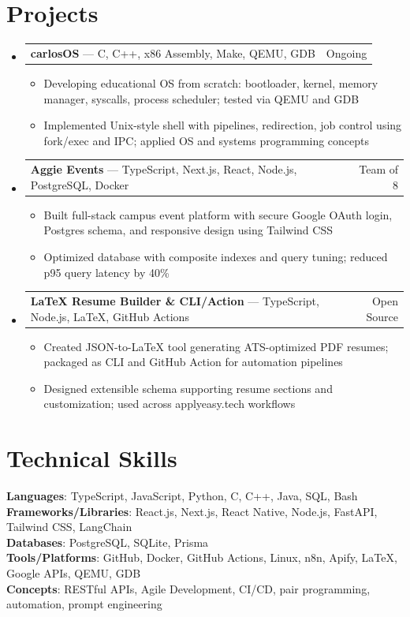 \documentclass[letterpaper,11pt]{article}
\makeatletter
\newcommand{\resumeItem}[1]{
  \item\small{{#1 \vspace{-2pt}}}
}
\newcommand{\resumeProjectHeading}[2]{
    \item
    \begin{tabular*}{0.97\textwidth}{l@{\extracolsep{\fill}}r}
      \small#1 & #2 \\
    \end{tabular*}\vspace{-7pt}
}
\newcommand{\resumeSubHeadingListStart}{\begin{itemize}[leftmargin=0.15in, label={}]}
\newcommand{\resumeSubHeadingListEnd}{\end{itemize}}
\newcommand{\resumeItemListStart}{\begin{itemize}}
\newcommand{\resumeItemListEnd}{\end{itemize}\vspace{-5pt}}
\makeatother
\begin{document}
\section{Projects}
\resumeSubHeadingListStart
  \resumeProjectHeading
    {\textbf{carlosOS} — C, C++, x86 Assembly, Make, QEMU, GDB}{Ongoing}
    \resumeItemListStart
      \resumeItem{Developing educational OS from scratch: bootloader, kernel, memory manager, syscalls, process scheduler; tested via QEMU and GDB}
      \resumeItem{Implemented Unix-style shell with pipelines, redirection, job control using fork/exec and IPC; applied OS and systems programming concepts}
    \resumeItemListEnd

  \resumeProjectHeading
    {\textbf{Aggie Events} — TypeScript, Next.js, React, Node.js, PostgreSQL, Docker}{Team of 8}
    \resumeItemListStart
      \resumeItem{Built full-stack campus event platform with secure Google OAuth login, Postgres schema, and responsive design using Tailwind CSS}
      \resumeItem{Optimized database with composite indexes and query tuning; reduced p95 query latency by 40\%}
    \resumeItemListEnd

  \resumeProjectHeading
    {\textbf{LaTeX Resume Builder \& CLI/Action} — TypeScript, Node.js, LaTeX, GitHub Actions}{Open Source}
    \resumeItemListStart
      \resumeItem{Created JSON-to-LaTeX tool generating ATS-optimized PDF resumes; packaged as CLI and GitHub Action for automation pipelines}
      \resumeItem{Designed extensible schema supporting resume sections and customization; used across applyeasy.tech workflows}
    \resumeItemListEnd
\resumeSubHeadingListEnd

\section{Technical Skills}
\begin{itemize}[leftmargin=0.15in, label={}]
  \small{\item{
    \textbf{Languages}{: TypeScript, JavaScript, Python, C, C++, Java, SQL, Bash} \\
    \textbf{Frameworks/Libraries}{: React.js, Next.js, React Native, Node.js, FastAPI, Tailwind CSS, LangChain} \\
    \textbf{Databases}{: PostgreSQL, SQLite, Prisma} \\
    \textbf{Tools/Platforms}{: GitHub, Docker, GitHub Actions, Linux, n8n, Apify, LaTeX, Google APIs, QEMU, GDB} \\
    \textbf{Concepts}{: RESTful APIs, Agile Development, CI/CD, pair programming, automation, prompt engineering}
  }}
\end{itemize}
\end{document}
